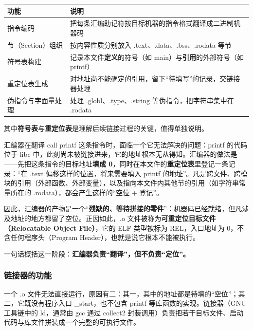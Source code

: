 \documentclass[UTF8,a4paper,10pt]{ctexart}
\newcommand{\headcol}{\bfseries}
\begin{document}
\begin{table}[H]
  \centering
  \small
  \setlength{\tabcolsep}{4pt}
  \begin{tabular}{>{\centering\arraybackslash}p{3cm}>{\centering\arraybackslash}p{10.2cm}}
    \toprule
\headcol 功能 & \headcol 说明 \\
    \midrule
指令编码 & 把每条汇编助记符按目标机器的指令格式翻译成二进制机器码 \\
    节（Section）组织 & 按内容性质分别放入 .text、.data、.bss、.rodata 等节 \\
    符号表构建 & 记录本文件\textbf{定义}的符号（如 main）与\textbf{引用}的外部符号（如 printf） \\
    重定位表生成 & 对地址尚不能确定的引用，留下“待填写”的记录，交链接器处理 \\
    伪指令与字面量处理 & 处理 .globl、.type、.string 等伪指令，把字符串集中在 .rodata \\
    \bottomrule
\end{tabular}
\end{table}

其中\textbf{符号表}与\textbf{重定位表}是理解后续链接过程的关键，值得单独说明。

汇编器在翻译 call printf 这条指令时，面临一个它无法解决的问题：printf 的代码位于 libc 中，此刻尚未被链接进来，它的地址根本无从得知。汇编器的做法是——先把这条指令的目标地址\textbf{填成 0}，同时在本文件的\textbf{重定位表}里登记一条记录：“在 .text 偏移这样的位置，将来需要填入 printf 的地址”。凡是跨文件、跨模块的引用（外部函数、外部变量），以及指向本文件内其他节的引用（如字符串常量所在的 .rodata），都会产生这样的“空位 + 登记”。

因此，汇编器的产物是一个“\textbf{残缺的、等待拼接的零件}”：机器码已经就绪，但凡涉及地址的地方都留了空位。正因如此，.o 文件被称为\textbf{可重定位目标文件（Relocatable Object File）}，它的 ELF 类型被标为 REL，入口地址为 0，不含任何程序头（Program Header），也就是说它根本不能被执行。

一句话概括这一阶段：\textbf{汇编器负责“翻译”，但不负责“定位”。}

\subsubsection{链接器的功能}

一个 .o 文件无法直接运行，原因有二：其一，其中的地址都是待填的“空位”；其二，它既没有程序入口 \_start，也不包含 printf 等库函数的实现。链接器（GNU 工具链中的 ld，通常由 gcc 通过 collect2 封装调用）负责把若干目标文件、启动代码与库文件拼装成一个完整的可执行文件。
\end{document}
